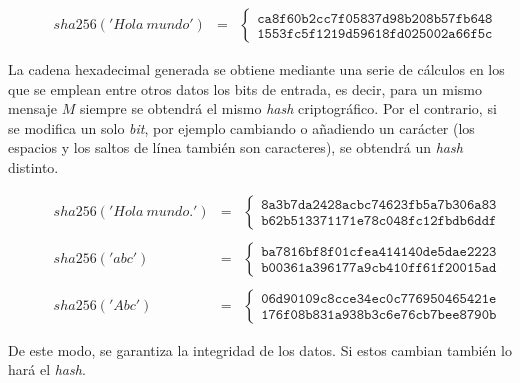 \documentclass{article}
\begin{document}
        \begin{figure}[H]
        \centering
            $\begin{array}{rcl}
                 sha256('Hola \ mundo') & = & \left \{
                \begin{array}{c}
                    \texttt{ca8f60b2cc7f05837d98b208b57fb648} \\
                    \texttt{1553fc5f1219d59618fd025002a66f5c}
                \end{array}
                \right .
            \end{array}$
        \end{figure}
        
    La cadena hexadecimal generada se obtiene mediante una serie de cálculos en los que se emplean entre otros datos los bits de entrada, es decir, para un mismo mensaje $M$ siempre se obtendrá el mismo \textit{hash} criptográfico. Por el contrario, si se modifica un solo \textit{bit}, por ejemplo cambiando o añadiendo un carácter (los espacios y los saltos de línea también son caracteres), se obtendrá un \textit{hash} distinto.
        \begin{figure}[H]
        \centering
            $\begin{array}{rcl}
                sha256('Hola \ mundo.') & = & \left \{
                \begin{array}{c}
                    \texttt{8a3b7da2428acbc74623fb5a7b306a83} \\
                    \texttt{b62b513371171e78c048fc12fbdb6ddf}
                \end{array}
                \right . \\
                 & \\
                 sha256('abc') & = & \left \{
                \begin{array}{c}
                    \texttt{ba7816bf8f01cfea414140de5dae2223} \\
                    \texttt{b00361a396177a9cb410ff61f20015ad}
                \end{array}
                \right . \\
                 & \\
                 sha256('Abc') & = & \left \{
                \begin{array}{c}
                    \texttt{06d90109c8cce34ec0c776950465421e} \\
                    \texttt{176f08b831a938b3c6e76cb7bee8790b}
                \end{array}
                \right .
            \end{array}$
        \end{figure}
    De este modo, se garantiza la integridad de los datos. Si estos cambian también lo hará el \textit{hash}.
\end{document}
